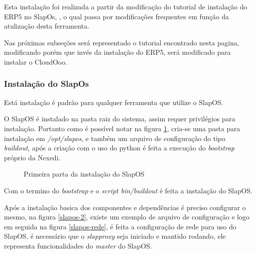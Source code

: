 Esta instalação foi realizada a partir da modificação do tutorial de instalação do ERP5 no SlapOs, \cite{ERP5-SLAPOS}, o qual passa por modificações frequentes em função da atulização desta ferramenta.

Nas próximas subseções será representado o tutorial encontrado nesta pagina, modificando porém que invés da instalação do ERP5, será modificado para instalar o CloudOoo.

\subsubsection{Instalação do SlapOs}

Está instalação é padrão para qualquer ferramenta que utilize o SlapOS.

O SlapOS é instalado na pasta raiz do sistema, assim requer privilégios para instalação. Portanto como é possível notar na figura \ref{slapos-1}, cria-se uma pasta para instalação em \textit{/opt/slapos}, e também um arquivo de configuração do tipo \textit{buildout}, após a criação com o uso do python é feita a execução do \textit{bootstrap} próprio da Nexedi.

\begin{figure}[ht]
    \centering
    \caption{Primeira parta da instalação do SlapOS}
    \label{slapos-1}
\end{figure}

Com o termino do \textit{bootstrap} e o \textit{ script bin/buildout} é feita a instalação do SlapOS.

Após a instalação basica dos componentes e dependências é preciso configurar o mesmo, na figura \ref{slapos-2}, existe um exemplo de arquivo de configuração e logo em seguida na figura \ref{slapos-rede}, é feita a configuração de rede para uso do SlapOS, é necessário que o \textit{slapproxy} seja iniciado e mantido rodando, ele representa funcionalidades do \textit{master} do SlapOS.

